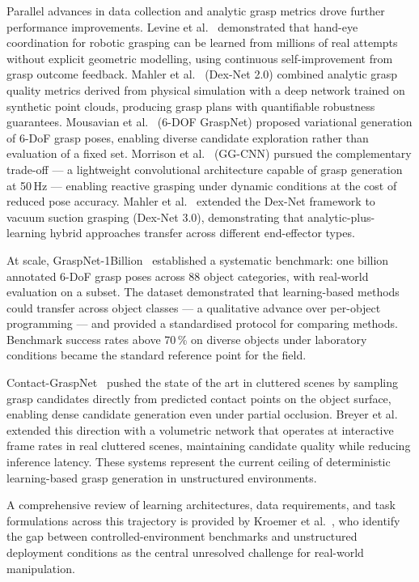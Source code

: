 \documentclass[12pt, a4paper]{report}
\begin{document}
Parallel advances in data collection and analytic grasp metrics drove further performance improvements. Levine et al.~\cite{levine2018learning} demonstrated that hand-eye coordination for robotic grasping can be learned from millions of real attempts without explicit geometric modelling, using continuous self-improvement from grasp outcome feedback. Mahler et al.~\cite{mahler2017dexnet} (Dex-Net 2.0) combined analytic grasp quality metrics derived from physical simulation with a deep network trained on synthetic point clouds, producing grasp plans with quantifiable robustness guarantees. Mousavian et al.~\cite{mousavian2019grasp} (6-DOF GraspNet) proposed variational generation of 6-DoF grasp poses, enabling diverse candidate exploration rather than evaluation of a fixed set. Morrison et al.~\cite{morrison2020learning} (GG-CNN) pursued the complementary trade-off --- a lightweight convolutional architecture capable of grasp generation at 50\,Hz --- enabling reactive grasping under dynamic conditions at the cost of reduced pose accuracy. Mahler et al.~\cite{mahler2018dexnet3} extended the Dex-Net framework to vacuum suction grasping (Dex-Net 3.0), demonstrating that analytic-plus-learning hybrid approaches transfer across different end-effector types.

At scale, GraspNet-1Billion~\cite{fang2020} established a systematic benchmark: one billion annotated 6-DoF grasp poses across 88 object categories, with real-world evaluation on a subset. The dataset demonstrated that learning-based methods could transfer across object classes --- a qualitative advance over per-object programming --- and provided a standardised protocol for comparing methods. Benchmark success rates above 70\,\% on diverse objects under laboratory conditions became the standard reference point for the field.

Contact-GraspNet~\cite{sundermeyer2021} pushed the state of the art in cluttered scenes by sampling grasp candidates directly from predicted contact points on the object surface, enabling dense candidate generation even under partial occlusion. Breyer et al.~\cite{breyer2021volumetric} extended this direction with a volumetric network that operates at interactive frame rates in real cluttered scenes, maintaining candidate quality while reducing inference latency. These systems represent the current ceiling of deterministic learning-based grasp generation in unstructured environments.

A comprehensive review of learning architectures, data requirements, and task formulations across this trajectory is provided by Kroemer et al.~\cite{kroemer2021review}, who identify the gap between controlled-environment benchmarks and unstructured deployment conditions as the central unresolved challenge for real-world manipulation.
\end{document}
